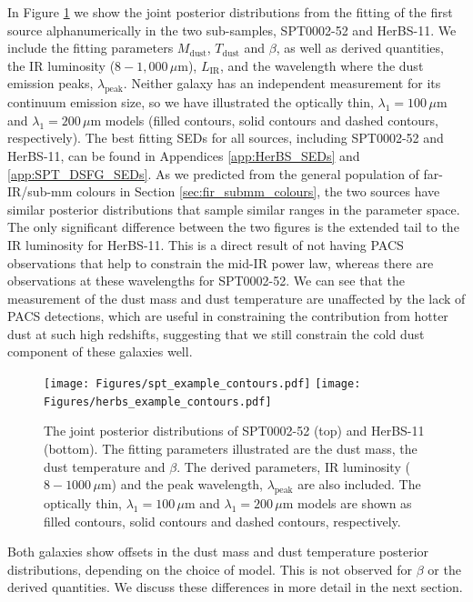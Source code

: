 In Figure \ref{fig:example_SEDs} we show the joint posterior distributions from the fitting of the first source alphanumerically in the two sub-samples, SPT0002-52 and HerBS-11. We include the fitting parameters $M_{\textrm{dust}}$, $T_{\textrm{dust}}$ and $\beta$, as well as derived quantities, the IR luminosity ($8 - 1,000\,\mu$m), $L_\textrm{IR}$, and the wavelength where the dust emission peaks, $\lambda_\textrm{peak}$. Neither galaxy has an independent measurement for its continuum emission size, so we have illustrated the optically thin, $\lambda_1 = 100\,\mu$m and $\lambda_1 = 200\,\mu$m models (filled contours, solid contours and dashed contours, respectively). The best fitting SEDs for all sources, including SPT0002-52 and HerBS-11, can be found in Appendices \ref{app:HerBS_SEDs} and \ref{app:SPT_DSFG_SEDs}. As we predicted from the general population of far-IR/sub-mm colours in Section \ref{sec:fir_submm_colours}, the two sources have similar posterior distributions that sample similar ranges in the parameter space. The only significant difference between the two figures is the extended tail to the IR luminosity for HerBS-11. This is a direct result of not having PACS observations that help to constrain the mid-IR power law, whereas there are observations at these wavelengths for SPT0002-52. We can see that the measurement of the dust mass and dust temperature are unaffected by the lack of PACS detections, which are useful in constraining the contribution from hotter dust at such high redshifts, suggesting that we still constrain the cold dust component of these galaxies well. 

\begin{figure}
	\centering
	\texttt{[image: Figures/spt\_example\_contours.pdf]}
	\texttt{[image: Figures/herbs\_example\_contours.pdf]}
	\caption[Posterior distributions for SPT0002-52 and HerBS-11]{The joint posterior distributions of SPT0002-52 (top) and HerBS-11 (bottom). The fitting parameters illustrated are the dust mass, the dust temperature and $\beta$. The derived parameters, IR luminosity ($8 - 1000\,\mu$m) and the peak wavelength, $\lambda_\textrm{peak}$ are also included. The optically thin, $\lambda_1 = 100\,\mu$m and $\lambda_1 = 200\,\mu$m models are shown as filled contours, solid contours and dashed contours, respectively.}
	\label{fig:example_SEDs}
\end{figure}

Both galaxies show offsets in the dust mass and dust temperature posterior distributions, depending on the choice of model. This is not observed for $\beta$ or the derived quantities. We discuss these differences in more detail in the next section.


